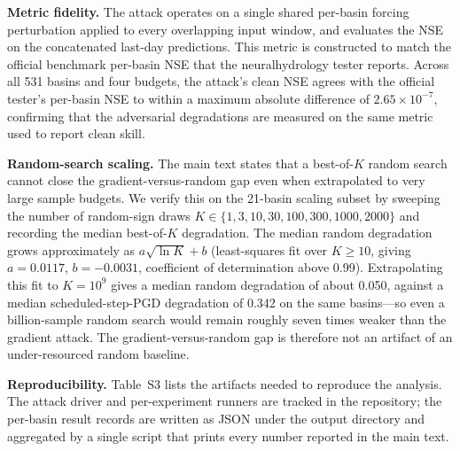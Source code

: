 \documentclass[final]{agujournal2019}
\begin{document}
\textbf{Metric fidelity.} The attack operates on a single shared per-basin forcing perturbation applied to every overlapping input window, and evaluates the NSE on the concatenated last-day predictions. This metric is constructed to match the official benchmark per-basin NSE that the neuralhydrology tester reports. Across all 531 basins and four budgets, the attack's clean NSE agrees with the official tester's per-basin NSE to within a maximum absolute difference of $2.65\times10^{-7}$, confirming that the adversarial degradations are measured on the same metric used to report clean skill.

\textbf{Random-search scaling.} The main text states that a best-of-$K$ random search cannot close the gradient-versus-random gap even when extrapolated to very large sample budgets. We verify this on the 21-basin scaling subset by sweeping the number of random-sign draws $K \in \{1, 3, 10, 30, 100, 300, 1000, 2000\}$ and recording the median best-of-$K$ degradation. The median random degradation grows approximately as $a\sqrt{\ln K} + b$ (least-squares fit over $K \ge 10$, giving $a = 0.0117$, $b = -0.0031$, coefficient of determination above 0.99). Extrapolating this fit to $K = 10^9$ gives a median random degradation of about 0.050, against a median scheduled-step-PGD degradation of 0.342 on the same basins---so even a billion-sample random search would remain roughly seven times weaker than the gradient attack. The gradient-versus-random gap is therefore not an artifact of an under-resourced random baseline.

\textbf{Reproducibility.} Table~S3 lists the artifacts needed to reproduce the analysis. The attack driver and per-experiment runners are tracked in the repository; the per-basin result records are written as JSON under the output directory and aggregated by a single script that prints every number reported in the main text.
\end{document}
